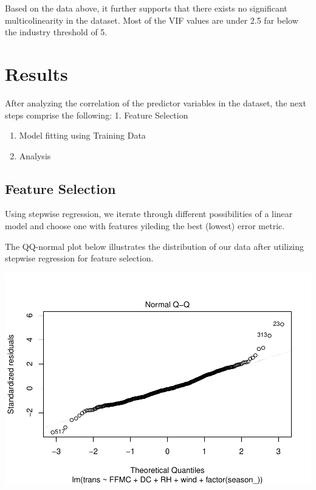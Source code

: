 \documentclass[conference,final,]{IEEEtran}
\makeatletter
\def\maxwidth{\ifdim\Gin@nat@width>\linewidth\linewidth
\else\Gin@nat@width\fi}
\let\Oldincludegraphics\includegraphics
\renewcommand{\includegraphics}[1]{\Oldincludegraphics[width=\maxwidth]{#1}}
\makeatother
\begin{document}
Based on the data above, it further supports that there exists no
significant multicolinearity in the dataset. Most of the VIF values are
under 2.5 far below the industry threshold of 5.

\hypertarget{results}{%
\section{Results}\label{results}}

After analyzing the correlation of the predictor variables in the
dataset, the next steps comprise the following: 1. Feature Selection

\begin{enumerate}
\def\labelenumi{\arabic{enumi}.}
\setcounter{enumi}{1}
\item
  Model fitting using Training Data 
\item
  Analysis 
\end{enumerate}

\hypertarget{feature-selection}{%
\subsection{Feature Selection}\label{feature-selection}}

Using stepwise regression, we iterate through different possibilities of
a linear model and choose one with features yileding the best (lowest)
error metric.

The QQ-normal plot below illustrates the distribution of our data after
utilizing stepwise regression for feature selection.

\includegraphics{forest_fires_files/figure-latex/unnamed-chunk-5-1.pdf}
\end{document}
